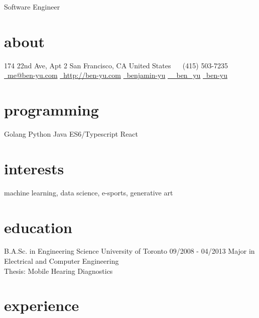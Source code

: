 \documentclass[]{friggeri-cv}
\begin{document}
       {Software Engineer}


\begin{aside}
  \section{about}
    174 22nd Ave, Apt 2
    San Francisco, CA
    United States
    ~
    \symbolfont\faPhone\bodyfont\ (415) 503-7235
    \href{mailto:me@ben-yu.com}{\symbolfont\faEnvelope\bodyfont\ me@ben-yu.com}
    \href{http://ben-yu.com}{\symbolfont\faGlobe \bodyfont\ http://ben-yu.com}
    \href{http://www.linkedin.com/pub/benjamin-yu/20/9b0/153}{\symbolfont{\faLinkedin} \bodyfont\ benjamin-yu}
    \href{http://twitter.com/_ben_yu}{\symbolfont\faTwitter \bodyfont\ \_ben\_yu}
    \href{https://github.com/ben-yu}{\symbolfont{\faGithub} \bodyfont\ ben-yu}
  \section{programming}
    Golang
    Python
    Java
    ES6/Typescript
    React
\end{aside}

\section{interests}

machine learning, data science, e-sports, generative art

\section{education}

\begin{entrylist}
  \entry
    {B.A.Sc. in Engineering Science}
    {University of Toronto}
    {09/2008 - 04/2013}
    {Major in Electrical and Computer Engineering \\
     Thesis: Mobile Hearing Diagnostics}

\end{entrylist}

\section{experience}
\end{document}
